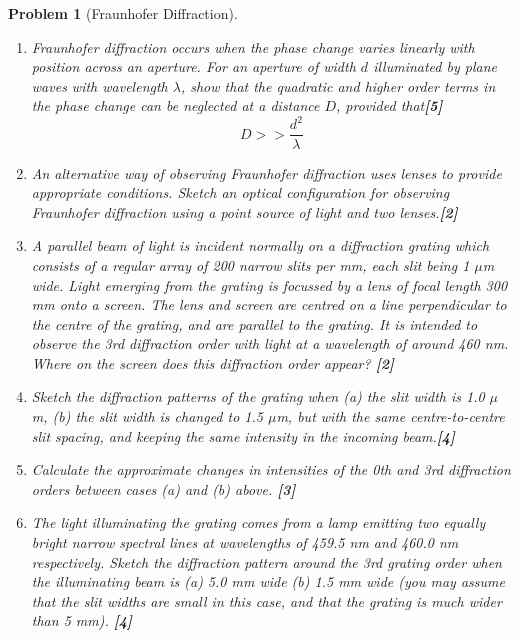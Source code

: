 \documentclass[a4paper]{article}
\theoremstyle{new}
\newtheorem{qns}{Problem}[subsection]
\begin{document}
\newpage
\begin{qns}[Fraunhofer Diffraction]\leavevmode
\begin{enumerate}[label=(\roman*)]
\item Fraunhofer diffraction occurs when the phase change varies linearly with position across an aperture. For an aperture of width $d$ illuminated by plane waves with wavelength $\lambda$, show that the quadratic and higher order terms in the phase change can be neglected at a distance $D$, provided that\hfill\textbf{[5]}
$$D>>\frac{d^2}{\lambda}$$
\item An alternative way of observing Fraunhofer diffraction uses lenses to provide appropriate conditions. Sketch an optical configuration for observing Fraunhofer diffraction using a point source of light and two lenses.\hfill\textbf{[2]}
\item A parallel beam of light is incident normally on a diffraction grating which consists of a regular array of 200 narrow slits per mm, each slit being 1 $\mu$m wide. Light emerging from the grating is focussed by a lens of focal length 300 mm onto a screen. The lens and screen are centred on a line perpendicular to the centre of the grating, and are parallel to the grating. It is intended to observe the 3rd diffraction order with light at a wavelength of around 460 nm. Where on the screen does this diffraction order appear? \hfill\textbf{[2]}
\item Sketch the diffraction patterns of the grating when (a) the slit width is 1.0 $\mu$m, (b) the slit width is changed to 1.5 $\mu$m, but with the same centre-to-centre slit spacing, and keeping the same intensity in the incoming beam.\hfill\textbf{[4]}
\item Calculate the approximate changes in intensities of the 0th and 3rd diffraction orders between cases (a) and (b) above. \hfill\textbf{[3]}
\item The light illuminating the grating comes from a lamp emitting two equally bright narrow spectral lines at wavelengths of 459.5 nm and 460.0 nm respectively. Sketch the diffraction pattern around the 3rd grating order when the illuminating beam is (a) 5.0 mm wide (b) 1.5 mm wide (you may assume that the slit widths are small in this case, and that the grating is much wider than 5 mm). \hfill\textbf{[4]}
\end{enumerate}
\end{qns}
\end{document}

